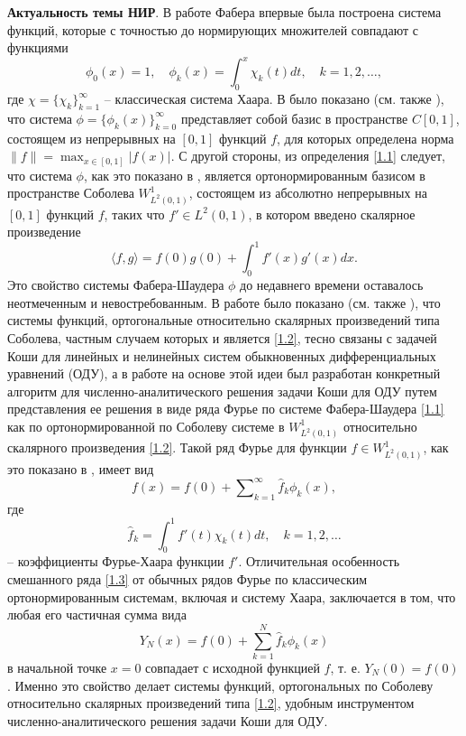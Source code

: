 \Introduction
\textbf{Актуальность темы НИР}.
В работе Фабера \cite{Faber} впервые была построена система функций, которые с точностью до нормирующих множителей совпадают с функциями
\begin{equation}\label{1.1}
\phi_{0}(x)=1, \quad \phi_{k}(x)=\int_{0}^{x}\chi_k(t)dt, \quad k=1,2,\ldots,
\end{equation}
где  $\chi=\{\chi_k\}_{k=1}^\infty$ --   классическая система Хаара.
В \cite{Faber} было показано (см. также \cite{Shauder}), что  система $\phi=\{\phi_k(x)\}_{k=0}^\infty$  представляет собой базис в пространстве $C[0,1]$, состоящем из непрерывных на $[0,1]$ функций $f$, для которых определена норма $\|f\|=\max_{x\in[0,1]}|f(x)|$. С другой стороны, из определения \eqref{1.1} следует, что система $\phi$, как это показано в \cite{SharIzv2018},  является ортонормированным базисом в  пространстве Соболева $W^1_{L^2(0,1)}$, состоящем из абсолютно непрерывных на $[0,1]$ функций $f$, таких что $f'\in L^2(0,1)$, в котором введено скалярное произведение
\begin{equation}\label{1.2}
\langle f,g\rangle=f(0)g(0)+\int_{0}^1f'(x)g'(x)dx.
\end{equation}
Это свойство системы Фабера-Шаудера $\phi$ до недавнего времени \cite{SharIzv2018} оставалось неотмеченным и невостребованным. В работе \cite{SharIzv2018} было показано (см. также \cite{SharDiffur2018}), что системы функций, ортогональные относительно скалярных произведений типа Соболева, частным случаем которых и является \eqref{1.2}, тесно связаны с задачей Коши для линейных и нелинейных систем обыкновенных дифференциальных уравнений (ОДУ), а в работе  \cite{MMG2016} на основе этой идеи был разработан конкретный алгоритм для численно-аналитического решения задачи Коши для  ОДУ путем представления ее решения в виде ряда Фурье по системе Фабера-Шаудера \eqref{1.1} как по ортонормированной по Соболеву системе в $W^1_{L^2(0,1)}$ относительно скалярного произведения \eqref{1.2}. Такой ряд Фурье для функции $f\in W^1_{L^2(0,1)}$, как это показано в \cite{SharIzv2018}, имеет вид
\begin{equation}\label{1.3}
f(x)=f(0)+\sum\nolimits_{k=1}^\infty \hat f_k \phi_{k}(x),
\end{equation}
где
\begin{equation}\label{1.4}
\hat f_k=\int_{0}^1f'(t)\chi_{k}(t)dt, \quad k=1,2,\ldots
\end{equation}
-- коэффициенты Фурье-Хаара функции $f'$. Отличительная особенность смешанного ряда \eqref{1.3} от обычных рядов Фурье по классическим ортонормированным системам, включая и систему Хаара, заключается в том, что любая его частичная сумма вида
\begin{equation}\label{1.5}
Y_N(x)=f(0)+\sum_{k=1}^N \hat f_k \phi_{k}(x)
\end{equation}
в начальной точке $x=0$ совпадает с исходной функцией $f$, т. е. $Y_N(0)=f(0)$. Именно это свойство делает системы функций, ортогональных по Соболеву относительно скалярных произведений типа \eqref{1.2}, удобным инструментом  численно-аналитического решения задачи Коши для ОДУ.

